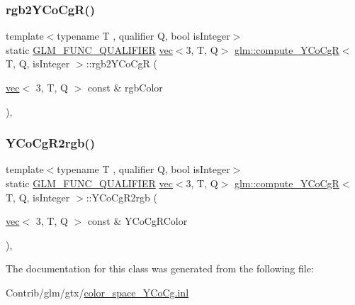 \subsubsection{\texorpdfstring{rgb2\+Y\+Co\+Cg\+R()}{rgb2YCoCgR()}}
{\footnotesize\ttfamily template$<$typename T , qualifier Q, bool is\+Integer$>$ \\
static \mbox{\hyperlink{setup_8hpp_a33fdea6f91c5f834105f7415e2a64407}{G\+L\+M\+\_\+\+F\+U\+N\+C\+\_\+\+Q\+U\+A\+L\+I\+F\+I\+ER}} \mbox{\hyperlink{structglm_1_1vec}{vec}}$<$3, T, Q$>$ \mbox{\hyperlink{classglm_1_1compute___y_co_cg_r}{glm\+::compute\+\_\+\+Y\+Co\+CgR}}$<$ T, Q, is\+Integer $>$\+::rgb2\+Y\+Co\+CgR (\begin{DoxyParamCaption}\item[{\mbox{\hyperlink{structglm_1_1vec}{vec}}$<$ 3, T, Q $>$ const \&}]{rgb\+Color }\end{DoxyParamCaption})\hspace{0.3cm}{\ttfamily [inline]}, {\ttfamily [static]}}

\mbox{\label{classglm_1_1compute___y_co_cg_r_a90eb0aada34098a657429dea2323e00a}} 
\subsubsection{\texorpdfstring{Y\+Co\+Cg\+R2rgb()}{YCoCgR2rgb()}}
{\footnotesize\ttfamily template$<$typename T , qualifier Q, bool is\+Integer$>$ \\
static \mbox{\hyperlink{setup_8hpp_a33fdea6f91c5f834105f7415e2a64407}{G\+L\+M\+\_\+\+F\+U\+N\+C\+\_\+\+Q\+U\+A\+L\+I\+F\+I\+ER}} \mbox{\hyperlink{structglm_1_1vec}{vec}}$<$3, T, Q$>$ \mbox{\hyperlink{classglm_1_1compute___y_co_cg_r}{glm\+::compute\+\_\+\+Y\+Co\+CgR}}$<$ T, Q, is\+Integer $>$\+::Y\+Co\+Cg\+R2rgb (\begin{DoxyParamCaption}\item[{\mbox{\hyperlink{structglm_1_1vec}{vec}}$<$ 3, T, Q $>$ const \&}]{Y\+Co\+Cg\+R\+Color }\end{DoxyParamCaption})\hspace{0.3cm}{\ttfamily [inline]}, {\ttfamily [static]}}



The documentation for this class was generated from the following file\+:\begin{DoxyCompactItemize}
\item 
Contrib/glm/gtx/\mbox{\hyperlink{color__space___y_co_cg_8inl}{color\+\_\+space\+\_\+\+Y\+Co\+Cg.\+inl}}\end{DoxyCompactItemize}
